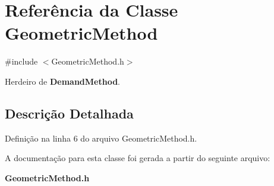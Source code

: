 \section{Referência da Classe Geometric\+Method}
\label{class_geometric_method}


{\ttfamily \#include $<$Geometric\+Method.\+h$>$}



Herdeiro de {\bf Demand\+Method}.



\subsection{Descrição Detalhada}


Definição na linha 6 do arquivo Geometric\+Method.\+h.



A documentação para esta classe foi gerada a partir do seguinte arquivo\+:\begin{DoxyCompactItemize}
\item 
{\bf Geometric\+Method.\+h}\end{DoxyCompactItemize}
